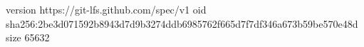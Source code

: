 version https://git-lfs.github.com/spec/v1
oid sha256:2be3d071592b8943d7d9b3274ddb6985762f665d7f7df346a673b59be570e48d
size 65632
